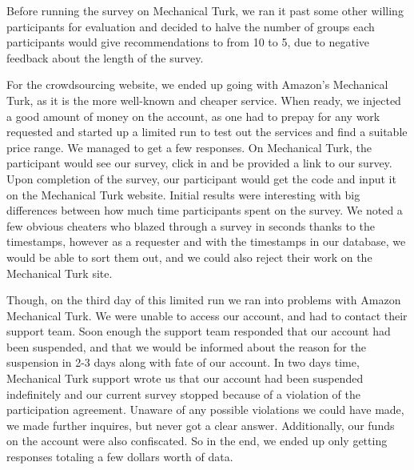 Before running the survey on Mechanical Turk, we ran it past some other willing participants for evaluation and decided to halve the number of groups each participants would give recommendations to from 10 to 5, due to negative feedback about the length of the survey.

For the crowdsourcing website, we ended up going with Amazon's Mechanical Turk, as it is the more well-known and cheaper service. When ready, we injected a good amount of money on the account, as one had to prepay for any work requested and started up a limited run to test out the services and find a suitable price range. We managed to get a few responses. On Mechanical Turk, the participant would see our survey, click in and be provided a link to our survey. Upon completion of the survey, our participant would get the code and input it on the Mechanical Turk website. Initial results were interesting with big differences between how much time participants spent on the survey. We noted a few obvious cheaters who blazed through a survey in seconds thanks to the timestamps, however as a requester and with the timestamps in our database, we would be able to sort them out, and we could also reject their work on the Mechanical Turk site.

Though, on the third day of this limited run we ran into problems with Amazon Mechanical Turk. We were unable to access our account, and had to contact their support team. Soon enough the support team responded that our account had been suspended, and that we would be informed about the reason for the suspension in 2-3 days along with fate of our account. In two days time, Mechanical Turk support wrote us that our account had been suspended indefinitely and our current survey stopped because of a violation of the participation agreement. Unaware of any possible violations we could have made, we made further inquires, but never got a clear answer. Additionally, our funds on the account were also confiscated. So in the end, we ended up only getting responses totaling a few dollars worth of data.

